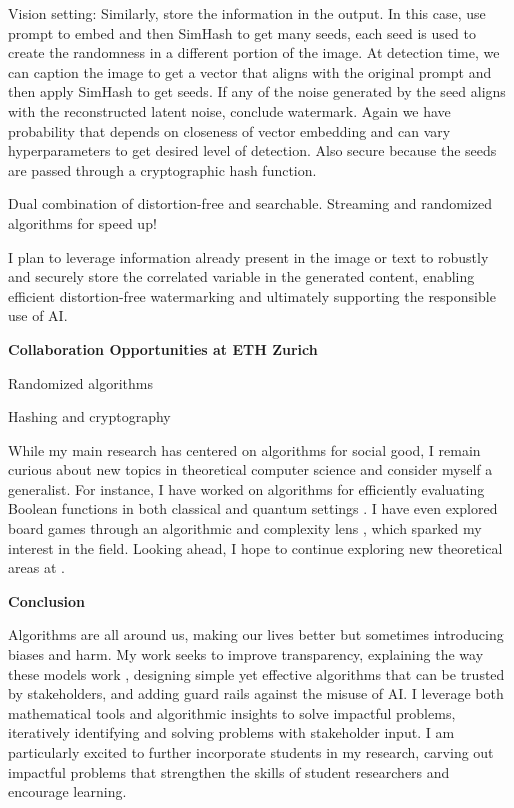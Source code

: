 \documentclass[11pt]{article}
\begin{document}
{Vision setting: Similarly, store the information in the output.
In this case, use prompt to embed and then SimHash to get many seeds, each seed is used to create the randomness in a different portion of the image.
At detection time, we can caption the image to get a vector that aligns with the original prompt and then apply SimHash to get seeds.
If any of the noise generated by the seed aligns with the reconstructed latent noise, conclude watermark.
Again we have probability that depends on closeness of vector embedding and can vary hyperparameters to get desired level of detection.
Also secure because the seeds are passed through a cryptographic hash function.

Dual combination of distortion-free and searchable.
Streaming and randomized algorithms for speed up!

I plan to leverage information already present in the image or text to robustly and securely store the correlated variable in the generated content, enabling efficient distortion-free watermarking and ultimately supporting the responsible use of AI.

{ \large \textbf{Collaboration Opportunities at ETH Zurich}}

Randomized algorithms

Hashing and cryptography

While my main research has centered on algorithms for social good, I remain curious about new topics in theoretical computer science and consider myself a generalist. For instance, I have worked on algorithms for efficiently evaluating Boolean functions in both classical \cite{hellerstein2022adaptivity} and quantum settings \cite{czekanski2023robust,kimmel2021query,delorenzo2019applications}. I have even explored board games through an algorithmic and complexity lens \cite{witter2020applications,witter2021backgammon}, which sparked my interest in the field.
Looking ahead, I hope to continue exploring new theoretical areas at \school.

\begin{center}
{ \large \textbf{Conclusion}}
\end{center}

Algorithms are all around us, making our lives better but sometimes introducing biases and harm. My work seeks to improve transparency, explaining the way these models work , designing simple yet effective algorithms that can be trusted by stakeholders, and adding guard rails against the misuse of AI. I leverage both mathematical tools and algorithmic insights to solve impactful problems, iteratively identifying and solving problems with stakeholder input. I am particularly excited to further incorporate students in my research, carving out impactful problems that strengthen the skills of student researchers and encourage learning.

}
\end{document}
